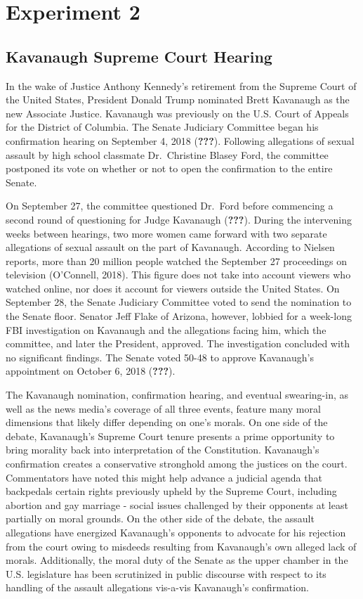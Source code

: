 \documentclass[,man]{apa6}
\begin{document}
\hypertarget{experiment-2}{%
\section{Experiment 2}\label{experiment-2}}

\hypertarget{kavanaugh-supreme-court-hearing}{%
\subsection{Kavanaugh Supreme Court Hearing}\label{kavanaugh-supreme-court-hearing}}

In the wake of Justice Anthony Kennedy's retirement from the Supreme Court of the United States, President Donald Trump nominated Brett Kavanaugh as the new Associate Justice. Kavanaugh was previously on the U.S. Court of Appeals for the District of Columbia. The Senate Judiciary Committee began his confirmation hearing on September 4, 2018 ({\textbf{???}}). Following allegations of sexual assault by high school classmate Dr.~Christine Blasey Ford, the committee postponed its vote on whether or not to open the confirmation to the entire Senate.

On September 27, the committee questioned Dr.~Ford before commencing a second round of questioning for Judge Kavanaugh ({\textbf{???}}). During the intervening weeks between hearings, two more women came forward with two separate allegations of sexual assault on the part of Kavanaugh. According to Nielsen reports, more than 20 million people watched the September 27 proceedings on television (O'Connell, 2018). This figure does not take into account viewers who watched online, nor does it account for viewers outside the United States. On September 28, the Senate Judiciary Committee voted to send the nomination to the Senate floor. Senator Jeff Flake of Arizona, however, lobbied for a week-long FBI investigation on Kavanaugh and the allegations facing him, which the committee, and later the President, approved. The investigation concluded with no significant findings. The Senate voted 50-48 to approve Kavanaugh's appointment on October 6, 2018 ({\textbf{???}}).

The Kavanaugh nomination, confirmation hearing, and eventual swearing-in, as well as the news media's coverage of all three events, feature many moral dimensions that likely differ depending on one's morals. On one side of the debate, Kavanaugh's Supreme Court tenure presents a prime opportunity to bring morality back into interpretation of the Constitution. Kavanaugh's confirmation creates a conservative stronghold among the justices on the court. Commentators have noted this might help advance a judicial agenda that backpedals certain rights previously upheld by the Supreme Court, including abortion and gay marriage - social issues challenged by their opponents at least partially on moral grounds. On the other side of the debate, the assault allegations have energized Kavanaugh's opponents to advocate for his rejection from the court owing to misdeeds resulting from Kavanaugh's own alleged lack of morals. Additionally, the moral duty of the Senate as the upper chamber in the U.S. legislature has been scrutinized in public discourse with respect to its handling of the assault allegations vis-a-vis Kavanaugh's confirmation.
\end{document}
